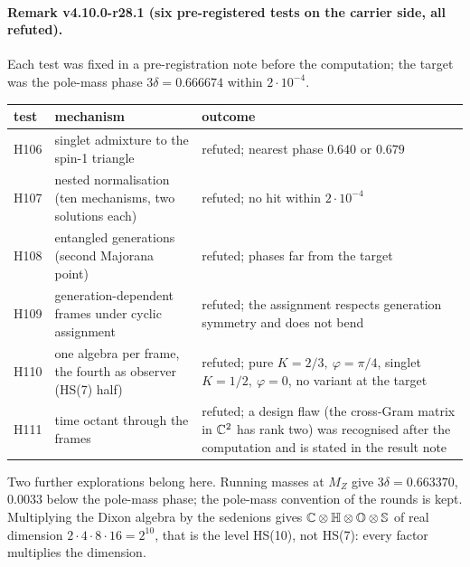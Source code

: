 \paragraph{Remark v4.10.0-r28.1 (six pre-registered tests on the carrier side, all refuted).}
Each test was fixed in a pre-registration note before the computation; the target was the pole-mass phase \(3\delta=0.666674\) within
\(2\cdot10^{-4}\).
\begin{center}
\small
\begin{tabular}{@{}>{\raggedright\arraybackslash}p{}>{\raggedright\arraybackslash}p{}>{\raggedright\arraybackslash}p{}@{}}
\toprule
test & mechanism & outcome\\
\midrule
H106 & singlet admixture to the spin-1 triangle & refuted; nearest phase \(0.640\) or \(0.679\)\\
H107 & nested normalisation (ten mechanisms, two solutions each) & refuted; no hit within \(2\cdot10^{-4}\)\\
H108 & entangled generations (second Majorana point) & refuted; phases far from the target\\
H109 & generation-dependent frames under cyclic assignment & refuted; the assignment respects generation symmetry and does not bend\\
H110 & one algebra per frame, the fourth as observer (HS(7) half) & refuted; pure \(K=2/3,\ \varphi=\pi/4\), singlet \(K=1/2,\ \varphi=0\), no variant at the target\\
H111 & time octant through the frames & refuted; a design flaw (the cross-Gram matrix in \(\mathbb C^2\) has rank two) was recognised after the computation and is
stated in the result note\\
\bottomrule
\end{tabular}
\end{center}
Two further explorations belong here.  Running masses at \(M_Z\) give \(3\delta=0.663370\), \(0.0033\) below the pole-mass phase; the
pole-mass convention of the rounds is kept.  Multiplying the Dixon algebra by the sedenions gives
\(\mathbb C\otimes\mathbb H\otimes\mathbb O\otimes\mathbb S\) of real dimension \(2\cdot4\cdot8\cdot16=2^{10}\), that is the level HS(10), not HS(7): every factor
multiplies the dimension.

